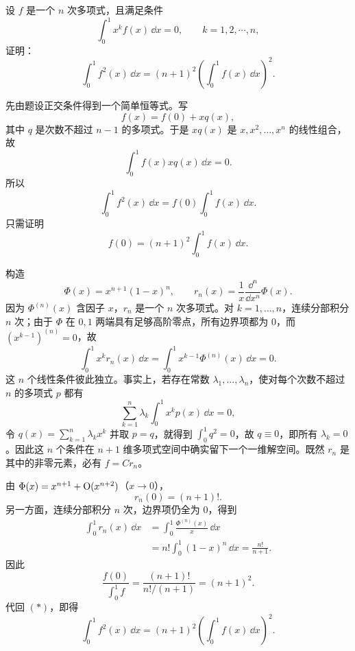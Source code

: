 \begin{xreferenceproblem}[5]
设 $f$ 是一个 $n$ 次多项式，且满足条件
\[
  \int_0^1x^kf(x)\,\dd x=0,\qquad k=1,2,\cdots,n,
\]
证明：
\[
  \int_0^1f^2(x)\,\dd x=(n+1)^2\left(\int_0^1f(x)\,\dd x\right)^2.
\]
\end{xreferenceproblem}
\begin{xsolution}
先由题设正交条件得到一个简单恒等式。写
\[
  f(x)=f(0)+xq(x),
\]
其中 $q$ 是次数不超过 $n-1$ 的多项式。于是 $xq(x)$ 是 $x,x^2,\ldots,x^n$ 的线性组合，故
\[
  \int_0^1 f(x)xq(x)\,\dd x=0.
\]
所以
\begin{equation}
  \int_0^1f^2(x)\,\dd x
  =f(0)\int_0^1f(x)\,\dd x.
  \tag{*}
\end{equation}
只需证明
\[
  f(0)=(n+1)^2\int_0^1f(x)\,\dd x.
\]

构造
\[
  \Phi(x)=x^{n+1}(1-x)^n,
  \qquad
  r_n(x)=\frac1x\frac{\dd^n}{\dd x^n}\Phi(x).
\]
因为 $\Phi^{(n)}(x)$ 含因子 $x$，$r_n$ 是一个 $n$ 次多项式。对 $k=1,\ldots,n$，连续分部积分 $n$ 次；由于 $\Phi$ 在 $0,1$ 两端具有足够高阶零点，所有边界项都为 $0$，而 $(x^{k-1})^{(n)}=0$，故
\[
  \int_0^1x^kr_n(x)\,\dd x
  =\int_0^1x^{k-1}\Phi^{(n)}(x)\,\dd x=0.
\]
这 $n$ 个线性条件彼此独立。事实上，若存在常数 $\lambda_1,\ldots,\lambda_n$，使对每个次数不超过 $n$ 的多项式 $p$ 都有
\[
  \sum_{k=1}^n\lambda_k\int_0^1x^kp(x)\,\dd x=0,
\]
令 $q(x)=\sum_{k=1}^n\lambda_kx^k$ 并取 $p=q$，就得到 $\int_0^1q^2=0$，故 $q\equiv0$，即所有 $\lambda_k=0$。因此这 $n$ 个条件在 $n+1$ 维多项式空间中确实留下一个一维解空间。既然 $r_n$ 是其中的非零元素，必有 $f=C r_n$。

由 $\Phi(x)=x^{n+1}+\mathrm{O}(x^{n+2})$（$x\to0$），
\[
  r_n(0)=(n+1)!.
\]
另一方面，连续分部积分 $n$ 次，边界项仍全为 $0$，得到
\begin{align*}
  \int_0^1r_n(x)\,\dd x
  &=\int_0^1\frac{\Phi^{(n)}(x)}x\,\dd x\\
  &=n!\int_0^1(1-x)^n\,\dd x
  =\frac{n!}{n+1}.
\end{align*}
因此
\[
  \frac{f(0)}{\int_0^1f}
  =\frac{(n+1)!}{n!/(n+1)}=(n+1)^2.
\]
代回 $(*)$，即得
\[
  \boxed{\int_0^1f^2(x)\,\dd x
  =(n+1)^2\left(\int_0^1f(x)\,\dd x\right)^2}.
\]
\end{xsolution}


